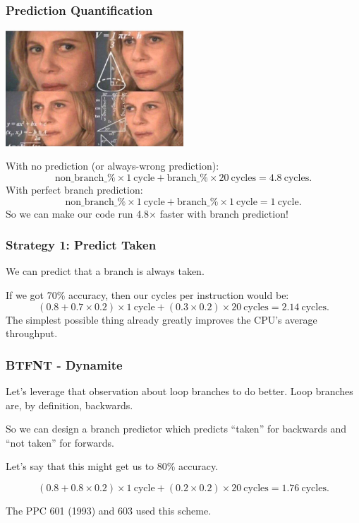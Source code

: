 \begin{frame}
\frametitle{Prediction Quantification}

\begin{center}
	\includegraphics[width=0.5\textwidth]{images/math.jpg}
\end{center}

With no prediction (or always-wrong prediction):
\[
\mathrm{non\_branch\_\%} \times 1 \mathrm{~cycle} + \mathrm{branch\_\%} \times 20 \mathrm{~cycles} = 4.8 \mathrm{~cycles}.
\]
With perfect branch prediction:
\[
\mathrm{non\_branch\_\%} \times 1 \mathrm{~cycle} + \mathrm{branch\_\%} \times 1 \mathrm{~cycle} = 1 \mathrm{~cycle}.
\]
So we can make our code run 4.8$\times$ faster with branch prediction!

\end{frame}


\begin{frame}
\frametitle{Strategy 1: Predict Taken}

We can predict that a branch is always taken. 

If we got 70\% accuracy, then our cycles per instruction would be:
\[
(0.8 + 0.7 \times 0.2) \times 1 \mathrm{~cycle} + (0.3 \times 0.2) \times 20 \mathrm{~cycles} = 2.14 \mathrm{~cycles}.
\]
The simplest possible thing already greatly improves the CPU's average throughput.

\end{frame}



\begin{frame}
\frametitle{BTFNT - Dynamite}

Let's leverage that observation about loop branches to do better.
Loop branches are, by definition, backwards. 

So we can design a branch predictor which predicts ``taken''
for backwards and ``not taken'' for forwards. 

Let's say that this might get us to 80\% accuracy. 

\[
(0.8 + 0.8 \times 0.2) \times 1 \mathrm{~cycle} + (0.2 \times 0.2) \times 20 \mathrm{~cycles} = 1.76 \mathrm{~cycles}.
\]


The PPC 601 (1993) and 603 used this scheme.

\end{frame}


